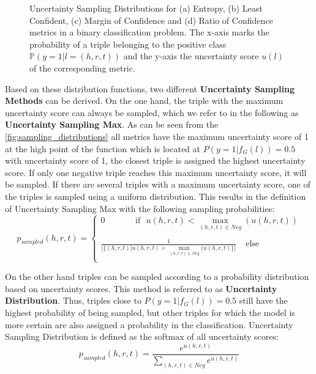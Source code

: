 \begin{figure}
\begin{minipage}{.5\textwidth}
    \end{minipage}%
    \caption{Uncertainty Sampling Distributions for (a) Entropy, (b) Least Confident, (c) Margin of Confidence and (d) Ratio of Confidence metrics in a binary classification problem.
    The x-axis marks the probability of a triple belonging to the positive class $\mathbb{P}(y = 1 | l = (h,r,t))$ and the y-axis the uncertainty score $u(l)$ of the corresponding metric.}
    \label{fig:sampling_distributions}
\end{figure}


Based on these distribution functions, two different \textbf{Uncertainty Sampling Methods} can be derived.
On the one hand, the triple with the maximum uncertainty score can always be sampled, which we refer to in the following as \textbf{Uncertainty Sampling Max}.
As can be seen from the \autoref{fig:sampling_distributions} all metrics have the maximum uncertainty score of 1 at the high point of the function which is located at $P(y = 1 | f_G(l)) = 0.5$ with uncertainty score of 1, the closest triple is assigned the highest uncertainty score.
If only one negative triple reaches this maximum uncertainty score, it will be sampled.
If there are several triples with a maximum uncertainty score, one of the triples is sampled using a uniform distribution.
This results in the definition of Uncertainty Sampling Max with the following sampling probabilities:
\begin{equation} 
    p_{sampled}(h, r, t)=
    \begin{cases}
         0 \ \ \ \ \ \  \ \ \ \ \ \ \ \  \ \ 
         \text{if}\ \ \ u(h, r, t) < \max_{(h,r,t) \in Neg}(u(h, r, t)) 
         \\ \\
        \frac{1}{|\{(h,r,t) | u(h,r,t) = \max_{(h,r,t) \in Neg}(u(h, r, t)\}|} 
        \ \ \ \ \
        \text{else} 
         \\
    \end{cases}
     \label{eq:uncertainty_max}
\end{equation}

On the other hand triples can be sampled according to a probability distribution based on uncertainty scores.
This method is referred to as \textbf{Uncertainty Distribution}.
Thus, triples close to $P(y = 1 | f_G(l)) = 0.5$ still have the highest probability of being sampled, but other triples for which the model is more certain are also assigned a probability in the classification.
Uncertainty Sampling Distribution is defined as the softmax of all uncertainty scores:
\begin{equation}
    \label{eq:uncertainty_distribution}
    p_{sampled}(h,r,t) = \frac{e^{u(h,r,t)}}{\sum_{(h,r,t) \in Neg}{e^{u(h,r,t)}}}
\end{equation}


